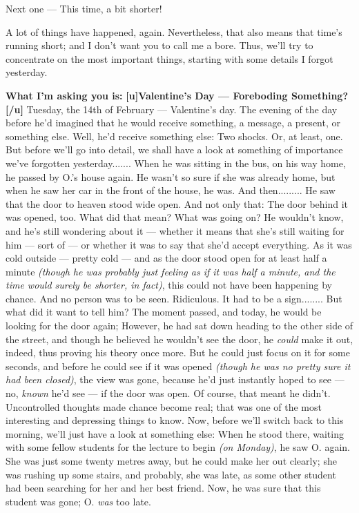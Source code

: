 Next one --- This time, a bit shorter!

A lot of things have happened, again. 
Nevertheless, that also means that time's running short; and I don't want you to call me a bore. 
Thus, we'll try to concentrate on the most important things, starting with some details I forgot yesterday. 

\textbf{What I'm asking you is:}
\textbf{[u]Valentine's Day --- Foreboding Something?[/u]}
Tuesday, the 14th of February --- Valentine's day. 
The evening of the day before he'd imagined that he would receive something, a message, a present, or something else. 
Well, he'd receive something else: Two shocks. 
Or, at least, one. 
But before we'll go into detail, we shall have a look at something of importance we've forgotten yesterday.......
When he was sitting in the bus, on his way home, he passed by O.'s house again. He wasn't so sure if she was already home, but when he saw her car in the front of the house, he was. And then.........
He saw that the door to heaven stood wide open. 
And not only that: The door behind it was opened, too. What did that mean?
What was going on?
He wouldn't know, and he's still wondering about it --- whether it means that she's still waiting for him --- sort of --- or whether it was to say that she'd accept everything. 
As it was cold outside --- pretty cold --- and as the door stood open for at least half a minute \emph{(though he was probably just feeling as if it was half a minute, and the time would surely be shorter, in fact)}, this could not have been happening by chance. And no person was to be seen. Ridiculous. It had to be a sign........
But what did it want to tell him?
The moment passed, and today, he would be looking for the door again; However, he had sat down heading to the other side of the street, and though he believed he wouldn't see the door, he \emph{could} make it out, indeed, thus proving his theory once more. But he could just focus on it for some seconds, and before he could see if it was opened \emph{(though he was no pretty sure it had been closed)}, the view was gone, because he'd just instantly hoped to see --- no, \emph{known} he'd see --- if the door was open. Of course, that meant he didn't. 
Uncontrolled thoughts made chance become real; that was one of the most interesting and depressing things to know. 
Now, before we'll switch back to this morning, we'll just have a look at something else: When he stood there, waiting with some fellow students for the lecture to begin \emph{(on Monday)}, he saw O. again. She was just some twenty metres away, but he could make her out clearly; she was rushing up some stairs, and probably, she was late, as some other student had been searching for her and her best friend. Now, he was sure that this student was gone; O. \emph{was} too late. 
